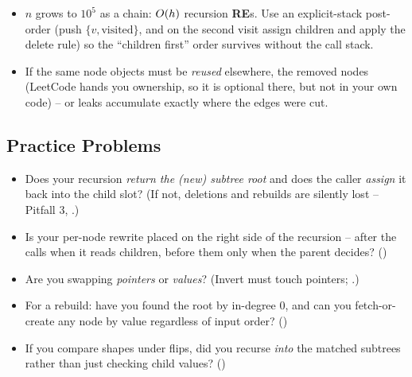 \begin{hardeningbox}
\begin{itemize}[nosep, leftmargin=1.4em]
  \item $n$ grows to $10^{5}$ as a chain: $O(h)$ recursion \textbf{RE}s. Use an
        explicit-stack post-order (push $\{v,\text{visited}\}$, and on the second
        visit assign children and apply the delete rule) so the ``children first''
        order survives without the call stack.
  \item If the same node objects must be \emph{reused} elsewhere,  the
        removed nodes (LeetCode hands you ownership, so it is optional there, but
        not in your own code) -- or leaks accumulate exactly where the edges were
        cut.
\end{itemize}
\end{hardeningbox}


\subsection{Practice Problems}

\begin{stuckbox}
\begin{itemize}[nosep, leftmargin=1.4em]
  \item Does your recursion \emph{return the (new) subtree root} and does the
        caller \emph{assign} it back into the child slot? (If not, deletions and
        rebuilds are silently lost -- Pitfall 3, .)
  \item Is your per-node rewrite placed on the right side of the recursion --
        after the calls when it reads children, before them only when the parent
        decides? ()
  \item Are you swapping \emph{pointers} or \emph{values}? (Invert must touch
        pointers; .)
  \item For a rebuild: have you found the root by in-degree $0$, and can you
        fetch-or-create any node by value regardless of input order?
        ()
  \item If you compare shapes under flips, did you recurse \emph{into} the
        matched subtrees rather than just checking child values? ()
\end{itemize}
\end{stuckbox}

